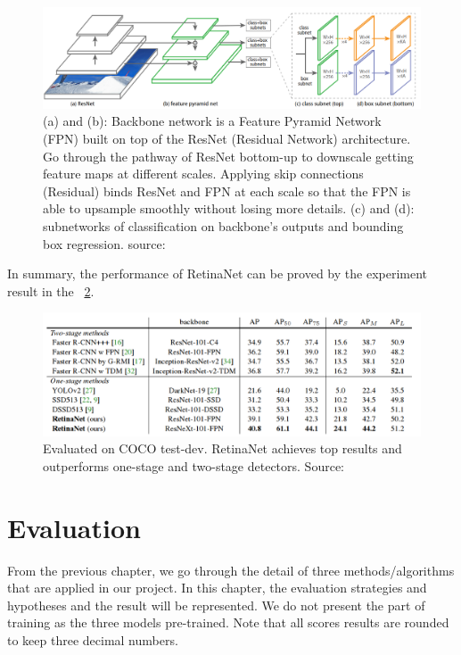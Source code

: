 \documentclass[runningheads]{llncs}
\begin{document}
\begin{figure}[H]
\includegraphics[width=\textwidth]{figs/RetinaNet_network.png}
\caption{(a) and (b): Backbone network is a Feature Pyramid Network (FPN) built on top of the ResNet (Residual Network) architecture. Go through the pathway of ResNet bottom-up to downscale getting feature maps at different scales. Applying skip connections (Residual) binds ResNet and FPN at each scale so that the FPN is able to upsample smoothly without losing more details. (c) and (d): subnetworks of classification on backbone’s outputs and bounding box regression. source: ~\cite{ref_retinanet}} \label{fig10}
\end{figure}

In summary, the performance of RetinaNet can be proved by the experiment result in the ~\ref{fig11}.
\begin{figure}[htbp]
\includegraphics[width=\textwidth]{figs/RetinaNet_object_detection.png}
\caption{Evaluated on COCO test-dev. RetinaNet achieves top results and outperforms one-stage and two-stage detectors. Source: ~\cite{ref_retinanet}} \label{fig11}
\end{figure}


\section{Evaluation}
From the previous chapter, we go through the detail of three methods/algorithms that are applied in our project. In this chapter, the evaluation strategies and hypotheses and the result will be represented. We do not present the part of training as the three models pre-trained. Note that all scores results are rounded to keep three decimal numbers.
\end{document}
